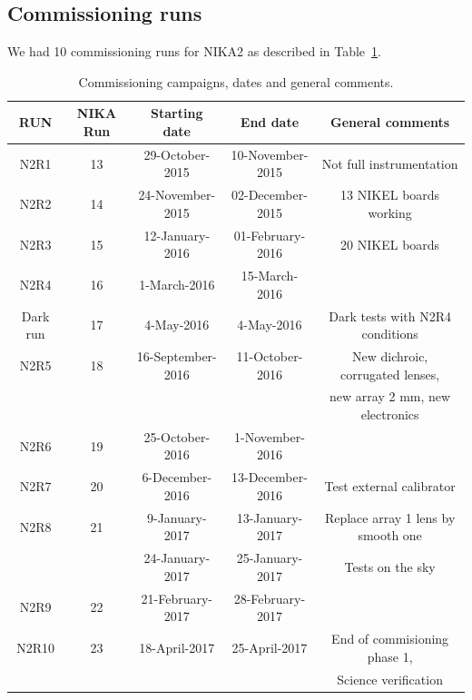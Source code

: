 \documentclass[a4paper, 11pt]{article} %
\begin{document}
\subsection{Commissioning runs}
We had 10 commissioning runs for NIKA2 as described in Table~\ref{nika2runs}.

\begin{table}[h]
\small
\caption{Commissioning campaigns, dates and general comments.
\label{nika2runs}}
\begin{tabular}{|c|c|c|c|c|}
\hline 
RUN  & NIKA Run & Starting date    & End date         &  General comments \\
\hline
N2R1     & 13       & 29-October-2015   & 10-November-2015 & Not full instrumentation        \\
N2R2     & 14       & 24-November-2015  & 02-December-2015 & 13 NIKEL boards working         \\
N2R3     & 15       & 12-January-2016   & 01-February-2016 & 20 NIKEL boards                 \\
N2R4     & 16       & 1-March-2016      & 15-March-2016    & 	                               \\
Dark run & 17       & 4-May-2016        & 4-May-2016       & Dark tests with N2R4 conditions  \\
\hline
N2R5     & 18       & 16-September-2016 & 11-October-2016  & New dichroic, corrugated lenses, \\
         &          &                   &                  &  new array 2 mm, new electronics \\
N2R6     & 19       & 25-October-2016   & 1-November-2016  &                                  \\
N2R7     & 20       & 6-December-2016   & 13-December-2016 & Test external calibrator         \\
N2R8     & 21       & 9-January-2017    & 13-January-2017  & Replace array 1 lens by smooth one \\
         &          & 24-January-2017   & 25-January-2017  & Tests on the sky   \\
N2R9     & 22       & 21-February-2017  & 28-February-2017 &                                   \\
N2R10    & 23       & 18-April-2017     & 25-April-2017    & End of commisioning phase 1,     \\
         &          &                   &                  & Science verification  \\  
\hline
\end{tabular} 
\end{table} 
\end{document}

